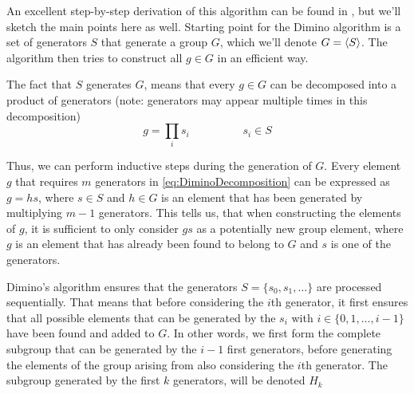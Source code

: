 \documentclass[parskip=half]{scrartcl}
\begin{document}
	An excellent step-by-step derivation of this algorithm can be found in \textcite{Butler1991a}, but we'll sketch the main points here as well.
	Starting point for the Dimino algorithm is a set of generators $S$ that generate a group $G$, which we'll denote $G = \braket{S}$. The algorithm
	then tries to construct all $g \in G$ in an efficient way.

	The fact that $S$ generates $G$, means that every $g \in G$ can be decomposed into a product of generators (note: generators may appear multiple
	times in this decomposition)
	\begin{equation}
		\label{eq:DiminoDecomposition}
		g = \prod_i s_i \hspace{2cm} s_i \in S
	\end{equation}

	Thus, we can perform inductive steps during the generation of $G$.\supercite{Butler1991a} Every element $g$ that requires $m$ generators in
	\cref{eq:DiminoDecomposition} can be expressed as $g = h s$, where $s \in S$ and $h \in G$ is an element that has been generated by multiplying
	$m-1$ generators.\supercite{Butler1991a} This tells us, that when constructing the elements of $g$, it is sufficient to only consider $gs$ as a
	potentially new group element, where $g$ is an element that has already been found to belong to $G$ and $s$ is one of the
	generators.\supercite{Butler1991a}

	Dimino's algorithm ensures that the generators $S = \{ s_0, s_1, \ldots \}$ are processed sequentially. That means that before considering the
	$i$th generator, it first ensures that all possible elements that can be generated by the $s_i$ with $i \in \{0, 1, \ldots, i - 1 \}$ have been
	found and added to $G$.\supercite{Butler1991a} In other words, we first form the complete subgroup that can be generated by the $i-1$ first
	generators, before generating the elements of the group arising from also considering the $i$th generator. The subgroup generated by the first $k$
	generators, will be denoted $H_k$
\end{document}
